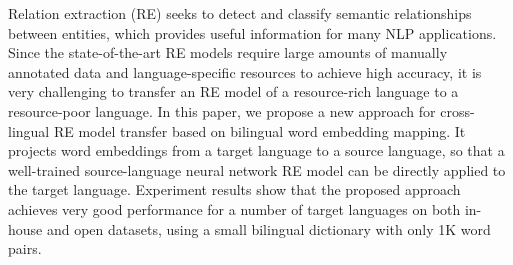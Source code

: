 Relation extraction (RE) seeks to detect and classify semantic relationships between entities, which provides useful information for many NLP applications. 
Since the state-of-the-art RE models require large amounts of manually annotated data and language-specific resources to achieve high accuracy, it is very challenging to transfer an RE model of a resource-rich language to a resource-poor language. In this paper, we propose a new approach for cross-lingual RE model transfer based on bilingual word embedding mapping. It projects word embeddings from a target language to a source language, so that a well-trained source-language neural network RE model can be directly applied to the target language. Experiment results show that the proposed approach achieves very good performance for a number of target languages on both in-house and open datasets, using a small bilingual dictionary with only 1K word pairs.